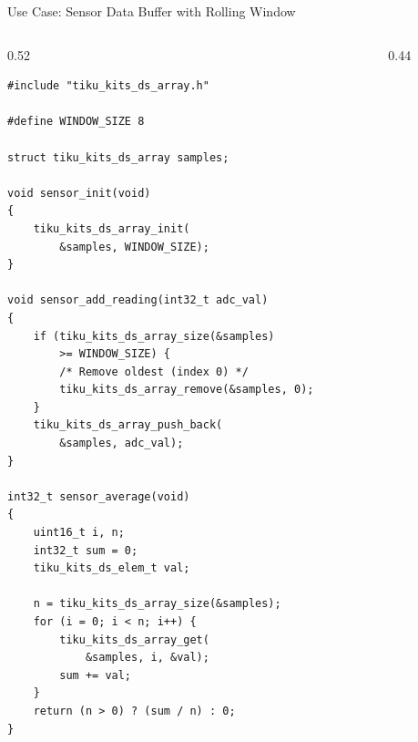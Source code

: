 \documentclass[aspectratio=169, 10pt]{beamer}
\begin{document}
\begin{frame}[fragile]{Use Case: Sensor Data Buffer with Rolling Window}
\begin{columns}[T]
\begin{column}{0.52\textwidth}
\begin{lstlisting}[style=cstyle,
  title={Collect N samples, compute average}]
#include "tiku_kits_ds_array.h"

#define WINDOW_SIZE 8

struct tiku_kits_ds_array samples;

void sensor_init(void)
{
    tiku_kits_ds_array_init(
        &samples, WINDOW_SIZE);
}

void sensor_add_reading(int32_t adc_val)
{
    if (tiku_kits_ds_array_size(&samples)
        >= WINDOW_SIZE) {
        /* Remove oldest (index 0) */
        tiku_kits_ds_array_remove(&samples, 0);
    }
    tiku_kits_ds_array_push_back(
        &samples, adc_val);
}

int32_t sensor_average(void)
{
    uint16_t i, n;
    int32_t sum = 0;
    tiku_kits_ds_elem_t val;

    n = tiku_kits_ds_array_size(&samples);
    for (i = 0; i < n; i++) {
        tiku_kits_ds_array_get(
            &samples, i, &val);
        sum += val;
    }
    return (n > 0) ? (sum / n) : 0;
}
\end{lstlisting}
\end{column}

\begin{column}{0.44\textwidth}
\begin{center}
\end{center}


\end{column}
\end{columns}
\end{frame}
\end{document}
